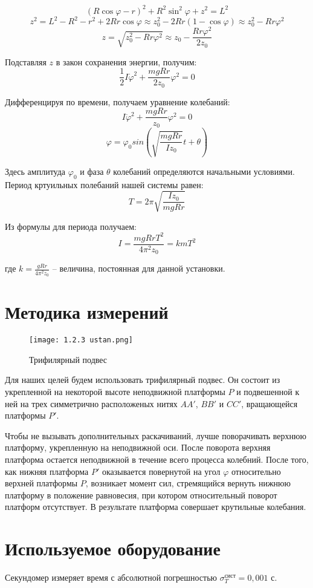 \documentclass[a4paper,12pt]{article}
\begin{document}
    $$(R\cos\varphi - r)^2 + R^2\sin^2\varphi + z^2 = L^2$$
    $$ z^2 = L^2 - R^2 - r^2 + 2Rr\cos\varphi \approx z^2_{0} - 2Rr(1 - \cos\varphi) \approx z^2_{0} - Rr\varphi^2 $$
	$$ z = \sqrt{z^2_{0} - Rr\varphi^2} \approx z_{0} - \frac{Rr\varphi^2}{2z_{0}} $$ \par
    Подставляя $z$ в закон сохранения энергии, получим:
    $$\frac{1}{2}I\dot\varphi^2 + \frac{mgRr}{2z_0}\varphi^2 = 0$$ \par
    Дифференцируя по времени, получаем уравнение колебаний:
    $$I\ddot\varphi^2 + \frac{mgRr}{z_0}\varphi^2 = 0$$
    $$\varphi = \varphi_0 sin \left(\sqrt{\frac{mgRr}{Iz_0}}t + \theta\right)$$ \par
    Здесь амплитуда $\varphi_0$ и фаза $\theta$ колебаний определяются начальными условиями. Период кртуильных полебаний нашей системы равен:
	$$T = 2\pi \sqrt{\frac{Iz_0}{mgRr}}$$ \par
    Из формулы для периода получаем:
    $$I = \frac{mgRrT^2}{4 \pi^2z_0} = kmT^2$$ \par
	где $k = \frac{gRr}{4\pi^2z_0}$ -- величина, постоянная для данной установки.

\section{Методика измерений}
    \begin{wrapfigure}{l}{7cm}
        \texttt{[image: 1.2.3 ustan.png]}
        \caption{Трифилярный подвес}
    \end{wrapfigure}

    Для наших целей будем использовать трифилярный подвес. Он состоит из укрепленной на некоторой высоте неподвижной платформы $P$ и подвешенной к ней на трех симметрично расположеных нитях $AA'$, $BB'$ и $CC'$, вращающейся платформы $P'$. \par
    Чтобы не вызывать дополнительных раскачиваний, лучше поворачивать верхнюю платформу, укрепленную на неподвижной оси. После поворота верхняя платформа остается неподвижной в течение всего процесса колебний. После того, как нижняя платформа $P'$ оказывается повернутой на угол $\varphi$ относительно верхней платформы $P$, возникает момент сил, стремящийся вернуть нижнюю платформу в положение равновесия, при котором относительный поворот платформ отсутствует. В результате платформа совершает крутильные колебания. 


\section{Используемое оборудование}
    Секундомер измеряет время с абсолютной погрешностью $\sigma_T^{\text{сист}} = 0,001$ с.
\end{document}
